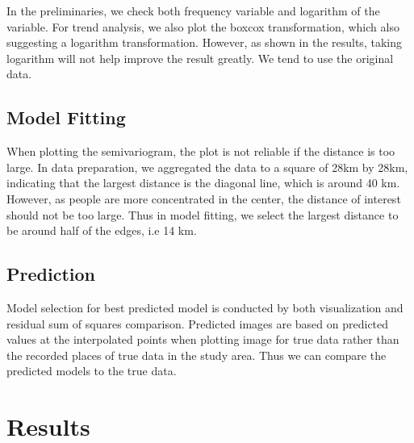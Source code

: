 \documentclass[hidelinks,12pt]{article}
\begin{document}
 	In the preliminaries, we check both frequency variable and logarithm of the variable. For trend analysis, we also plot the boxcox transformation, which also suggesting a logarithm transformation. However, as shown in the results, taking logarithm will not help improve the result greatly. We tend to use the original data.
	\subsection{Model Fitting}
	When plotting the semivariogram, the plot is not reliable if the distance is too large. In data preparation, we aggregated the data to a square of 28km by 28km, indicating that the largest distance is the diagonal line, which is around 40 km. However, as people are more concentrated in the center, the distance of interest should not be too large. Thus in model fitting, we select the largest distance to be around half of the edges, i.e 14 km.
	\subsection{Prediction}
	Model selection for best predicted model is conducted by both visualization and residual sum of squares comparison. Predicted images are based on predicted values at the interpolated points when plotting image for true data rather than the recorded places of true data in the study area. Thus we can compare the predicted models to the true data. 
	
	\section{Results}\label{sec:res}
\end{document}
